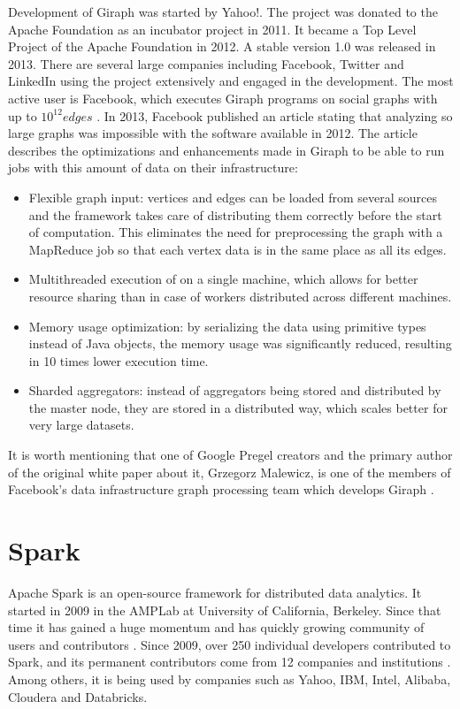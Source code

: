 Development of Giraph was started by Yahoo!. The project was donated to the Apache Foundation as an incubator project in 2011. It became a Top Level Project of the Apache Foundation in 2012. A stable version 1.0 was released in 2013. There are several large companies including Facebook, Twitter and LinkedIn using the project extensively and engaged in the development. The most active user is Facebook, which executes Giraph programs on social graphs with up to $10^12 edges$ \cite{giraphfb}. In 2013, Facebook published an article \cite{giraphfb} stating that analyzing so large graphs was impossible with the software available in 2012. The article describes the optimizations and enhancements made in Giraph to be able to run jobs with this amount of data on their infrastructure:
\begin{itemize}
\item Flexible graph input: vertices and edges can be loaded from several sources and the framework takes care of distributing them correctly before the start of computation. This eliminates the need for preprocessing the graph with a MapReduce job so that each vertex data is in the same place as all its edges.
\item Multithreaded execution of on a single machine, which allows for better resource sharing than in case of workers distributed across different machines.
\item Memory usage optimization: by serializing the data using primitive types instead of Java objects, the memory usage was significantly reduced, resulting in 10 times lower execution time.
\item Sharded aggregators: instead of aggregators being stored and distributed by the master node, they are stored in a distributed way, which scales better for very large datasets.
\end{itemize}
It is worth mentioning that one of Google Pregel creators and the primary author of the original white paper about it, Grzegorz Malewicz, is one of the members of Facebook's data infrastructure graph processing team which develops Giraph \cite{giraphfb}.

\section{Spark}
Apache Spark \cite{spark, spark2} is an open-source framework for distributed data analytics. It started in 2009 in the AMPLab at University of California, Berkeley. Since that time it has gained a huge momentum and has quickly growing community of users and contributors \cite{sparkgrowingcommunity}. Since 2009, over 250 individual developers contributed to Spark, and its permanent contributors come from 12 companies and institutions \cite{sparkwww}. Among others, it is being used by companies such as Yahoo, IBM, Intel, Alibaba, Cloudera and Databricks.

